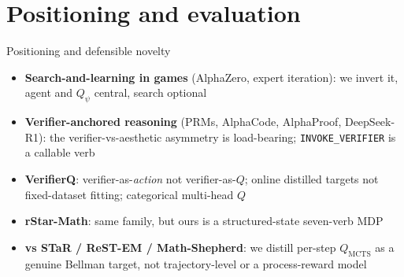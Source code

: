 \documentclass[aspectratio=169]{beamer}
\newcommand{\Qpsi}{Q_\psi}
\newcommand{\QMCTS}{Q_{\mathrm{MCTS}}}
\newcommand{\verbword}[1]{\texttt{#1}}
\begin{document}
\section{Positioning and evaluation}

\begin{frame}{Positioning and defensible novelty}
  \begin{itemize}
    \item \textbf{Search-and-learning in games} (AlphaZero, expert iteration): we \alert{invert} it, agent and $\Qpsi$ central, search optional
    \item \textbf{Verifier-anchored reasoning} (PRMs, AlphaCode, AlphaProof, DeepSeek-R1): the verifier-vs-aesthetic asymmetry is load-bearing; \verbword{INVOKE\_VERIFIER} is a callable verb
    \item \textbf{VerifierQ}: verifier-as-\emph{action} not verifier-as-$Q$; online distilled targets not fixed-dataset fitting; categorical multi-head $Q$
    \item \textbf{rStar-Math}: same family, but ours is a structured-state seven-verb MDP
    \item \textbf{vs STaR / ReST-EM / Math-Shepherd}: we distill per-step $\QMCTS$ as a genuine Bellman target, not trajectory-level or a process-reward model
  \end{itemize}
\end{frame}
\end{document}
